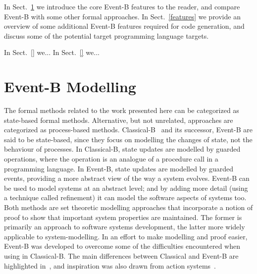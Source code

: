 In Sect.~\ref{eventb} we introduce the core Event-B features to the reader, and compare Event-B with some other formal approaches.  In Sect.~\ref{features} we provide an overview of some additional Event-B features required for code generation, and discuss some of the potential target programming language targets.

In Sect.~\ref{} we...
In Sect.~\ref{} we...

\section{Event-B Modelling}\label{eventb}
The formal methods related to the work presented here can be categorized as state-based formal methods. Alternative, but not unrelated, approaches are categorized as process-based methods. Classical-B~\cite{TheBBook,CNP,B4Free,atelierB} and its successor, Event-B are said to be state-based, since they focus on modelling the changes of state, not the behaviour of processes. In Classical-B, state updates are modelled by guarded operations, where the operation is an analogue of a procedure call in a programming language. In Event-B, state updates are modelled by guarded events, providing a more abstract view of the way a system evolves. Event-B can be used to model systems at an abstract level; and by adding more detail (using a technique called refinement) it can model the software aspects of systems too. Both methods are set theoretic modelling approaches that incorporate a notion of proof to show that important system properties are maintained. The former is primarily an approach to software systems development, the latter more widely applicable to system-modelling. In an effort to make modelling and proof easier, Event-B was developed to overcome some of the difficulties encountered when using in Classical-B. The main differences between Classical and Event-B are highlighted in~\cite{Hallerstede07}, and inspiration was also drawn from action systems~\cite{Back1990133}.

